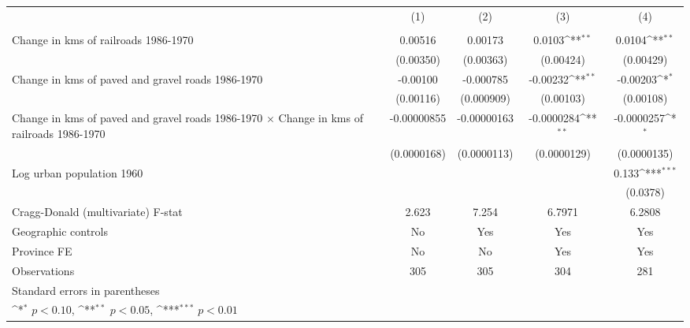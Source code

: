 {
\def\sym#1{\ifmmode^{#1}\else\(^{#1}\)\fi}
\begin{tabular}{l*{4}{c}}
\hline\hline
                &\multicolumn{1}{c}{(1)}&\multicolumn{1}{c}{(2)}&\multicolumn{1}{c}{(3)}&\multicolumn{1}{c}{(4)}\\
                &\multicolumn{1}{c}{}&\multicolumn{1}{c}{}&\multicolumn{1}{c}{}&\multicolumn{1}{c}{}\\
\hline
Change in kms of railroads 1986-1970&  0.00516         &  0.00173         &   0.0103\sym{**} &   0.0104\sym{**} \\
                &(0.00350)         &(0.00363)         &(0.00424)         &(0.00429)         \\
[1em]
Change in kms of paved and gravel roads 1986-1970& -0.00100         &-0.000785         & -0.00232\sym{**} & -0.00203\sym{*}  \\
                &(0.00116)         &(0.000909)         &(0.00103)         &(0.00108)         \\
[1em]
Change in kms of paved and gravel roads 1986-1970 $\times$ Change in kms of railroads 1986-1970&-0.00000855         &-0.00000163         &-0.0000284\sym{**} &-0.0000257\sym{*}  \\
                &(0.0000168)         &(0.0000113)         &(0.0000129)         &(0.0000135)         \\
[1em]
Log urban population 1960&                  &                  &                  &    0.133\sym{***}\\
                &                  &                  &                  & (0.0378)         \\
\hline
Cragg-Donald (multivariate) F-stat&    2.623         &    7.254         &   6.7971         &   6.2808         \\
Geographic controls&       No         &      Yes         &      Yes         &      Yes         \\
Province FE     &       No         &       No         &      Yes         &      Yes         \\
Observations    &      305         &      305         &      304         &      281         \\
\hline\hline
\multicolumn{5}{l}{\footnotesize Standard errors in parentheses}\\
\multicolumn{5}{l}{\footnotesize \sym{*} \(p<0.10\), \sym{**} \(p<0.05\), \sym{***} \(p<0.01\)}\\
\end{tabular}
}
